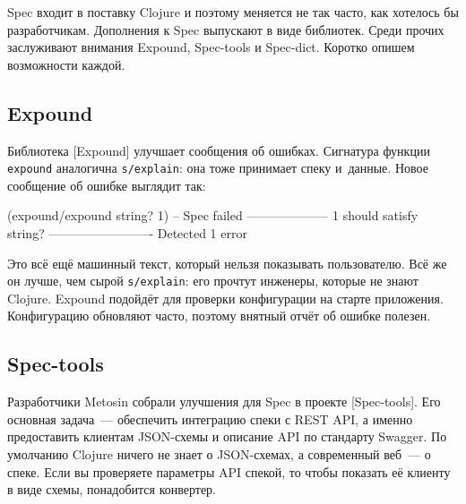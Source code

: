 Spec входит в поставку Clojure и поэтому меняется не так часто, как хотелось бы
разработчикам. Дополнения к Spec выпускают в виде библиотек. Среди прочих
заслуживают внимания Expound, Spec-tools и Spec-dict. Коротко опишем возможности каждой.

\subsection{Expound}

\label{expound}

Библиотека [Expound] улучшает сообщения об
ошибках. Сигнатура функции \verb|expound| аналогична \verb|s/explain|: она
тоже принимает спеку и~данные. Новое сообщение об ошибке выглядит так:


\begin{english}
  \begin{clojure}
(expound/expound string? 1)
-- Spec failed --------------------
  1
should satisfy
  string?
-------------------------
Detected 1 error
  \end{clojure}
\end{english}


Это всё ещё машинный текст, который нельзя показывать пользователю. Всё же он
лучше, чем сырой \verb|s/explain|: его прочтут инженеры, которые не знают
Clojure. Expound подойдёт для проверки конфигурации на старте
приложения. Конфигурацию обновляют часто, поэтому внятный отчёт об ошибке
полезен.


\subsection{Spec-tools}

Разработчики Metosin собрали улучшения для Spec в проекте
[Spec-tools]. Его
основная задача~--- обеспечить интеграцию спеки с REST API, а именно
предоставить клиентам JSON-схемы и описание API по стандарту Swagger. По
умолчанию Clojure ничего не знает о JSON-схемах, а современный веб~--- о
спеке. Если вы проверяете параметры API спекой, то чтобы показать её клиенту в
виде схемы, понадобится конвертер.

